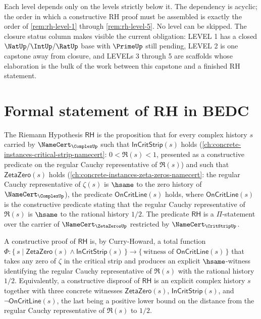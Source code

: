 \begin{remark}
\label{rem:rh-chain-reading}
Each level depends only on the levels strictly below it. The dependency is acyclic; the order in which a constructive RH proof must be assembled is exactly the order of \autoref{rem:rh-level-1} through \autoref{rem:rh-level-5}. No level can be skipped. The closure status column makes visible the current obligation: LEVEL 1 has a closed $\NatUp/\IntUp/\RatUp$ base with $\PrimeUp$ still pending, LEVEL 2 is one capstone away from closure, and LEVELs 3 through 5 are scaffolds whose elaboration is the bulk of the work between this capstone and a finished RH statement.
\end{remark}

\section{Formal statement of RH in BEDC}
\label{sec:rh-formal-statement}

\begin{definition}[RH predicate]
\label{def:rh-predicate}
The Riemann Hypothesis $\mathsf{RH}$ is the proposition that for every complex history $s$ carried by $\NameCert_{\ComplexUp}$ such that $\mathsf{InCritStrip}(s)$ holds (\autoref{ch:concrete-instances-critical-strip-namecert}: $0 < \Re(s) < 1$, presented as a constructive predicate on the regular Cauchy representative of $\Re(s)$) and such that $\mathsf{ZetaZero}(s)$ holds (\autoref{ch:concrete-instances-zeta-zeros-namecert}: the regular Cauchy representative of $\zeta(s)$ is $\hsame$ to the zero history of $\NameCert_{\ComplexUp}$), the predicate $\mathsf{OnCritLine}(s)$ holds, where $\mathsf{OnCritLine}(s)$ is the constructive predicate stating that the regular Cauchy representative of $\Re(s)$ is $\hsame$ to the rational history $1/2$. The predicate $\mathsf{RH}$ is a $\Pi$-statement over the carrier of $\NameCert_{\ZetaZerosUp}$ restricted by $\NameCert_{\CritStripUp}$.
\end{definition}

\begin{proposition}
\label{prop:rh-constructive-form}
A constructive proof of $\mathsf{RH}$ is, by Curry-Howard, a total function
\(\Phi : \{\, s \mid \mathsf{ZetaZero}(s) \wedge \mathsf{InCritStrip}(s) \,\} \to \{\, \text{witness of } \mathsf{OnCritLine}(s) \,\}\)
that takes any zero of $\zeta$ in the critical strip and produces an explicit $\hsame$-witness identifying the regular Cauchy representative of $\Re(s)$ with the rational history $1/2$. Equivalently, a constructive disproof of $\mathsf{RH}$ is an explicit complex history $s$ together with three concrete witnesses $\mathsf{ZetaZero}(s)$, $\mathsf{InCritStrip}(s)$, and $\neg\mathsf{OnCritLine}(s)$, the last being a positive lower bound on the distance from the regular Cauchy representative of $\Re(s)$ to $1/2$.
\end{proposition}

